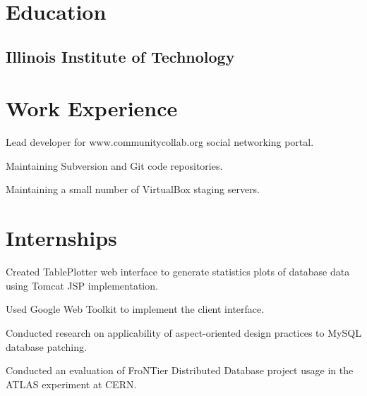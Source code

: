 \documentclass{resume}
\begin{document}
\author{Dmitry Ratnikov}
\maketitle

\section{Education}

\subsection{Illinois Institute of Technology}


\section{Work Experience}

\begin{compactitem}
  \item Lead developer for www.communitycollab.org social networking portal.
  \item Maintaining Subversion and Git code repositories.
  \item Maintaining a small number of VirtualBox staging servers.
\end{compactitem}

\section{Internships}

\begin{compactitem}
  \item Created TablePlotter web interface to generate statistics plots of database data using Tomcat JSP implementation.
  \item Used Google Web Toolkit to implement the client interface.
\end{compactitem}

\begin{compactitem}
  \item Conducted research on applicability of aspect-oriented design practices to MySQL database patching.
  \item Conducted an evaluation of FroNTier Distributed Database project usage in the ATLAS experiment at CERN.
\end{compactitem}
\end{document}
